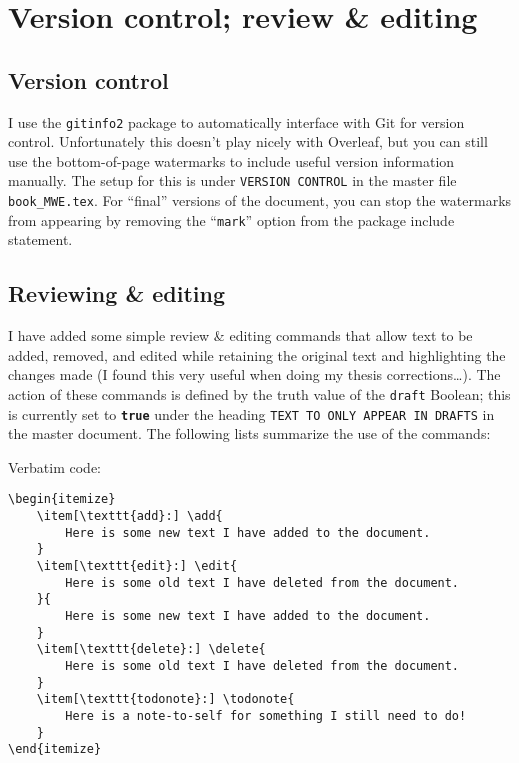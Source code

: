 \section{Version control; review \& editing}

\subsection{Version control}
I use the \texttt{gitinfo2} package to automatically interface with Git for version control.
Unfortunately this doesn't play nicely with Overleaf, but you can still use the bottom-of-page watermarks to include useful version information manually.
The setup for this is under \texttt{VERSION CONTROL} in the master file \texttt{book\_MWE.tex}.
For ``final'' versions of the document, you can stop the watermarks from appearing by removing the ``\texttt{mark}'' option from the package include statement.

\subsection{Reviewing \& editing}
I have added some simple review \& editing commands that allow text to be added, removed, and edited while retaining the original text and highlighting the changes made (I found this very useful when doing my thesis corrections\dots).
The action of these commands is defined by the truth value of the \texttt{draft} Boolean; this is currently set to \textbf{\texttt{true}} under the heading \texttt{TEXT TO ONLY APPEAR IN DRAFTS} in the master document.
The following lists summarize the use of the commands:

\noindent Verbatim code:
\begin{verbatim}
\begin{itemize}
    \item[\texttt{add}:] \add{
        Here is some new text I have added to the document.
    }
    \item[\texttt{edit}:] \edit{
        Here is some old text I have deleted from the document.
    }{
        Here is some new text I have added to the document.
    }
    \item[\texttt{delete}:] \delete{
        Here is some old text I have deleted from the document.
    }
    \item[\texttt{todonote}:] \todonote{
        Here is a note-to-self for something I still need to do!
    }
\end{itemize}
\end{verbatim}

